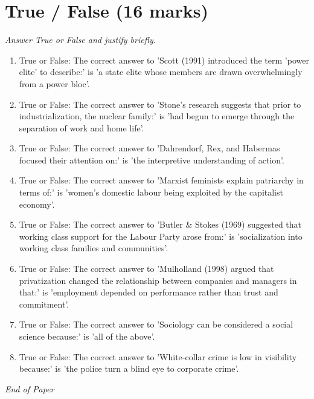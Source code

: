 \documentclass[12pt]{article}
\begin{document}
\section*{True / False (16 marks)}
\textit{Answer True or False and justify briefly.}
\begin{enumerate}[label=\arabic*.]
\item True or False: The correct answer to 'Scott (1991) introduced the term 'power elite' to describe:' is 'a state elite whose members are drawn overwhelmingly from a power bloc'.
\item True or False: The correct answer to 'Stone's research suggests that prior to industrialization, the nuclear family:' is 'had begun to emerge through the separation of work and home life'.
\item True or False: The correct answer to 'Dahrendorf, Rex, and Habermas focused their attention on:' is 'the interpretive understanding of action'.
\item True or False: The correct answer to 'Marxist feminists explain patriarchy in terms of:' is 'women's domestic labour being exploited by the capitalist economy'.
\item True or False: The correct answer to 'Butler \& Stokes (1969) suggested that working class support for the Labour Party arose from:' is 'socialization into working class families and communities'.
\item True or False: The correct answer to 'Mulholland (1998) argued that privatization changed the relationship between companies and managers in that:' is 'employment depended on performance rather than trust and commitment'.
\item True or False: The correct answer to 'Sociology can be considered a social science because:' is 'all of the above'.
\item True or False: The correct answer to 'White-collar crime is low in visibility because:' is 'the police turn a blind eye to corporate crime'.
\end{enumerate}

\vfill
\noindent\textit{End of Paper}
\end{document}
